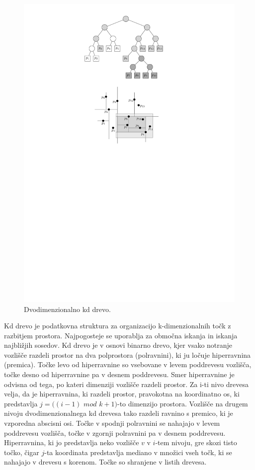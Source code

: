 \documentclass[a4paper, 12pt]{book}
\begin{document}
\begin{figure}		
\centerline{\includegraphics[scale=1.2]{pics/kdTree4.pdf}}		
\caption{Dvodimenzionalno kd drevo.}		
\label{kd-primer}		
\end{figure}
Kd drevo je podatkovna struktura za organizacijo k-dimenzionalnih točk z razbitjem prostora. Najpogosteje se uporablja za območna iskanja in iskanja najbližjih sosedov.
Kd drevo je v osnovi binarno drevo, kjer vsako notranje vozlišče razdeli prostor na dva polprostora (polravnini), ki ju ločuje hiperravnina (premica). Točke levo od hiperravnine so vsebovane v levem poddrevesu vozlišča, točke desno od hiperravnine pa v desnem poddrevesu. Smer hiperravnine je odvisna od tega, po kateri dimenziji vozlišče razdeli prostor.
Za i-ti nivo drevesa velja, da je hiperravnina, ki razdeli prostor, pravokotna na koordinatno os, ki predstavlja $j = ((i-1)$ $mod$ $k + 1)$-to dimenzijo prostora. Vozlišče na drugem nivoju dvodimenzionalnega kd drevesa tako razdeli
ravnino s premico, ki je vzporedna abscisni osi. Točke v spodnji polravnini se nahajajo v levem poddrevesu vozlišča, točke v zgornji polravnini pa v desnem poddrevesu. Hiperravnina, ki jo predstavlja neko vozlišče $v$ v $i$-tem nivoju,
gre skozi tisto točko, čigar $j$-ta koordinata predstavlja mediano v množici vseh točk, ki se nahajajo v drevesu s korenom. Točke so shranjene v listih drevesa.
\end{document}
